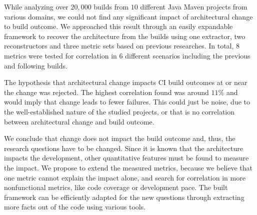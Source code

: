 \documentclass[conference]{IEEEtran}
\begin{document}
While analyzing over $20,000$ builds from $10$ different Java Maven projects from various domains, we could not find any significant impact of architectural change to build outcome.
We approached this result through an easily expandable framework to recover the architecture from the builds using one extractor, two reconstructors and three metric sets based on previous researches. In total, $8$ metrics were tested for correlation in $6$ different scenarios including the previous and following builds. 

The hypothesis that architectural change impacts CI build outcomes at or near the change was rejected. The highest correlation found was around $11\%$ and would imply that change leads to fewer failures. This could just be noise, due to the well-established nature of the studied projects, or that is no correlation between architectural change and build outcome. 

We conclude that change does not impact the build outcome and, thus, the research questions have to be changed. Since it is known that the architecture impacts the development, other quantitative features must be found to measure the impact. We propose to extend the measured metrics, because we believe that one metric cannot explain the impact alone, and search for correlation in more nonfunctional metrics, like code coverage or development pace.
The built framework can be efficiently adapted for the new questions through extracting more facts out of the code using various tools. 



\end{document}
